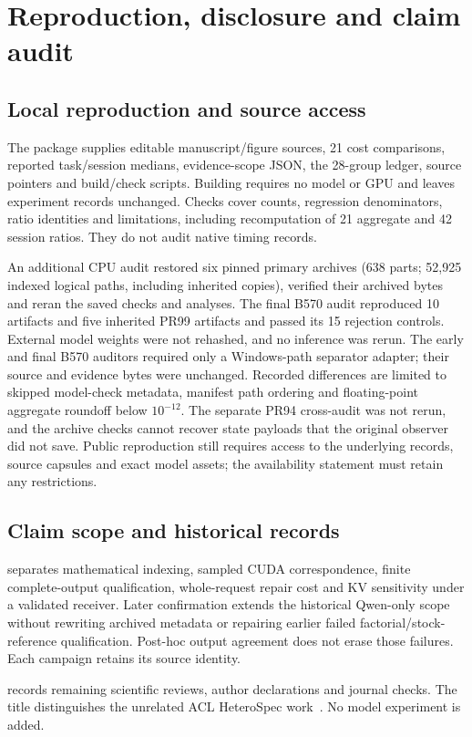\section{Reproduction, disclosure and claim audit}
\label{supp:reproduction}
\subsection{Local reproduction and source access}
The package supplies editable manuscript/figure sources, 21 cost comparisons, reported task/session medians, evidence-scope JSON, the 28-group ledger, source pointers and build/check scripts. Building requires no model or GPU and leaves experiment records unchanged. Checks cover counts, regression denominators, ratio identities and limitations, including recomputation of 21 aggregate and 42 session ratios. They do not audit native timing records.

An additional CPU audit restored six pinned primary archives (638 parts; 52,925 indexed logical paths, including inherited copies), verified their archived bytes and reran the saved checks and analyses. The final B570 audit reproduced 10 artifacts and five inherited PR99 artifacts and passed its 15 rejection controls. External model weights were not rehashed, and no inference was rerun. The early and final B570 auditors required only a Windows-path separator adapter; their source and evidence bytes were unchanged. Recorded differences are limited to skipped model-check metadata, manifest path ordering and floating-point aggregate roundoff below $10^{-12}$. The separate PR94 cross-audit was not rerun, and the archive checks cannot recover state payloads that the original observer did not save. Public reproduction still requires access to the underlying records, source capsules and exact model assets; the availability statement must retain any restrictions.

\subsection{Claim scope and historical records}
 separates mathematical indexing, sampled CUDA correspondence, finite complete-output qualification, whole-request repair cost and KV sensitivity under a validated receiver. Later confirmation extends the historical Qwen-only scope without rewriting archived metadata or repairing earlier failed factorial/stock-reference qualification. Post-hoc output agreement does not erase those failures. Each campaign retains its source identity.

 records remaining scientific reviews, author declarations and journal checks. The title distinguishes the unrelated ACL HeteroSpec work~\cite{aclheterospec}. No model experiment is added.
